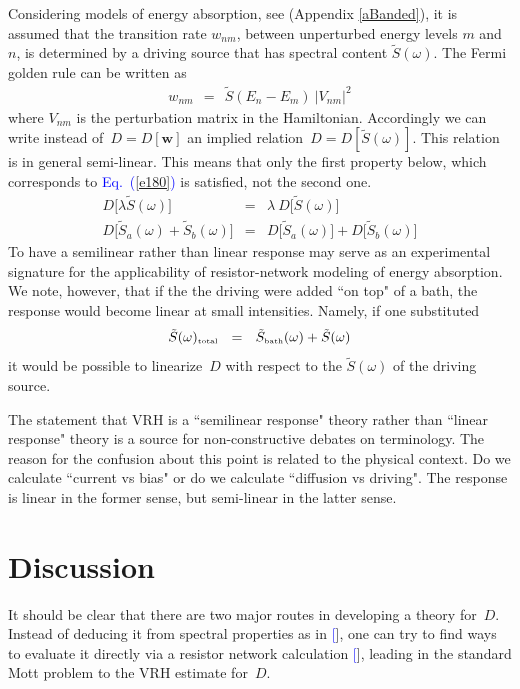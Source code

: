 \documentclass[aps,pre,floats,floatfix,twocolumn]{revtex4}
\newcommand{\tbox}[1]{\mbox{\tiny #1}}
\newcommand{\beq}{\begin{eqnarray}}
\newcommand{\eeq}{\end{eqnarray}}
\newcommand{\Eq}[1]{\textcolor{blue}{Eq.\!\!~(\ref{#1})}}
\renewcommand{\cite}[1]{\textcolor{blue}{[\onlinecite{#1}}]} %
\begin{document}
Considering models of energy absorption, see (Appendix \ref{aBanded}), 
it is assumed that the transition rate $w_{nm}$, between 
unperturbed energy levels $m$ and $n$, is determined 
by a driving source that has spectral content $\tilde{S}(\omega)$.
The Fermi golden rule can be written as  
%
\beq
w_{nm} \ \ = \ \ \tilde{S}(E_n-E_m) \ |V_{nm}|^2
\eeq
%
where $V_{nm}$ is the perturbation matrix in the Hamiltonian.
Accordingly we can write instead of~$D=D[\bm{w}]$ 
an implied relation~$D=D[\tilde{S}(\omega)]$.
This relation is in general semi-linear. 
This means that only the first property below, 
which corresponds to \Eq{e180} is satisfied, 
not the second one.
%
\beq
D\big[ \lambda \tilde{S}(\omega)\big]  &=&   \lambda \ D\big[\tilde{S}(\omega)\big] 
\\
D\big[\tilde{S}_a(\omega) + \tilde{S}_b(\omega)\big]  &=&  D\big[\tilde{S}_a(\omega)\big] + D\big[\tilde{S}_b(\omega)\big]
\eeq
%
To have a semilinear rather than linear response 
may serve as an experimental signature for the 
applicability of resistor-network modeling of energy 
absorption. We note, however, that if the 
the driving were added ``on top" of a bath, 
the response would become linear at small intensities. 
Namely, if one substituted    
%
\beq
\tilde{S}(\omega)_{\tbox{total}} \ \ = \ \ \tilde{S}_{\tbox{bath}}(\omega) + \tilde{S}(\omega)
\eeq  
%
it would be possible to linearize~$D$ with respect 
to the $\tilde{S}(\omega)$ of the driving source. 

The statement that VRH is a ``semilinear response" theory rather than ``linear response"
theory is a source for non-constructive debates on terminology. The reason for the 
confusion about this point is related to the physical context. 
Do we calculate ``current vs bias" or do we calculate ``diffusion vs driving".
The response is linear in the former sense, but semi-linear in the latter sense.


\section{Discussion}

It should be clear that there are two major routes in developing  
a theory for~$D$. Instead of deducing it from spectral properties 
as in \cite{amir}, one can try to find ways to evaluate it directly 
via a resistor network calculation \cite{miller,AHL,Halp,pollak,VRHbook}, 
leading in the standard Mott problem to the VRH estimate for~$D$.   
\end{document}
